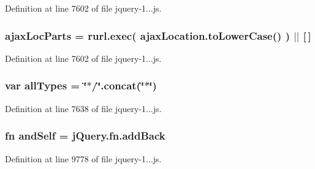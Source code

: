 Definition at line 7602 of file jquery-\/1...\+js.

\subsubsection[{\texorpdfstring{ajax\+Loc\+Parts}{ajaxLocParts}}]{\setlength{\rightskip}{0pt plus 5cm}ajax\+Loc\+Parts = rurl.\+exec( ajax\+Location.\+to\+Lower\+Case() ) $\vert$$\vert$ \mbox{[}$\,$\mbox{]}}\hypertarget{_scripts_2jquery-1_810_82_8js_a4c35110da3c335cfca38505ee65a5e79}{}\label{_scripts_2jquery-1_810_82_8js_a4c35110da3c335cfca38505ee65a5e79}


Definition at line 7602 of file jquery-\/1...\+js.

\subsubsection[{\texorpdfstring{all\+Types}{allTypes}}]{\setlength{\rightskip}{0pt plus 5cm}var all\+Types = \char`\"{}$\ast$/\char`\"{}.concat(\char`\"{}$\ast$\char`\"{})}\hypertarget{_scripts_2jquery-1_810_82_8js_a2d6199559f6d1e840af674910a329b04}{}\label{_scripts_2jquery-1_810_82_8js_a2d6199559f6d1e840af674910a329b04}


Definition at line 7638 of file jquery-\/1...\+js.

\subsubsection[{\texorpdfstring{and\+Self}{andSelf}}]{ {\bf fn} and\+Self = j\+Query.\+fn.\+add\+Back}\hypertarget{_scripts_2jquery-1_810_82_8js_a63df20b949f6e6fc37d300a41fd9c02b}{}\label{_scripts_2jquery-1_810_82_8js_a63df20b949f6e6fc37d300a41fd9c02b}


Definition at line 9778 of file jquery-\/1...\+js.

